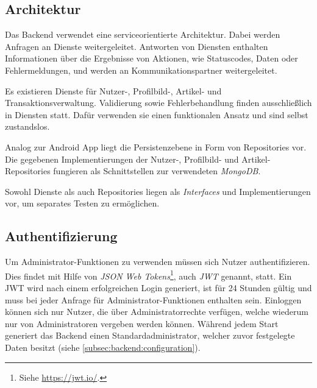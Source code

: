 \documentclass[a4paper, 11pt]{article}
\begin{document}
\subsection{Architektur}
\label{subsec:backend:architecture}
Das Backend verwendet eine serviceorientierte Architektur.
Dabei werden Anfragen an Dienste weitergeleitet.
Antworten von Diensten enthalten Informationen über die Ergebnisse von Aktionen, wie Statuscodes, Daten oder Fehlermeldungen, und werden an Kommunikationspartner weitergeleitet.

Es existieren Dienste für Nutzer-, Profilbild-, Artikel- und Transaktionsverwaltung.
Validierung sowie Fehlerbehandlung finden ausschließlich in Diensten statt.
Dafür verwenden sie einen funktionalen Ansatz und sind selbst zustandslos.

Analog zur Android App liegt die Persistenzebene in Form von Repositories vor.
Die gegebenen Implementierungen der Nutzer-, Profilbild- und Artikel-Repositories fungieren als Schnittstellen zur verwendeten \textit{MongoDB}.

Sowohl Dienste als auch Repositories liegen als \textit{Interfaces} und Implementierungen vor, um separates Testen zu ermöglichen.

\subsection{Authentifizierung}
\label{subsec:backend:authentication}
Um Administrator-Funktionen zu verwenden müssen sich Nutzer authentifizieren.
Dies findet mit Hilfe von \textit{JSON Web Tokens}\footnote{Siehe \url{https://jwt.io/}.}, auch \textit{JWT} genannt, statt.
Ein JWT wird nach einem erfolgreichen Login generiert, ist für 24 Stunden gültig und muss bei jeder Anfrage für Administrator-Funktionen enthalten sein.
Einloggen können sich nur Nutzer, die über Administratorrechte verfügen, welche wiederum nur von Administratoren vergeben werden können.
Während jedem Start generiert das Backend einen Standard\-administrator, welcher zuvor festgelegte Daten besitzt (siehe \autoref{subsec:backend:configuration}).
\end{document}
